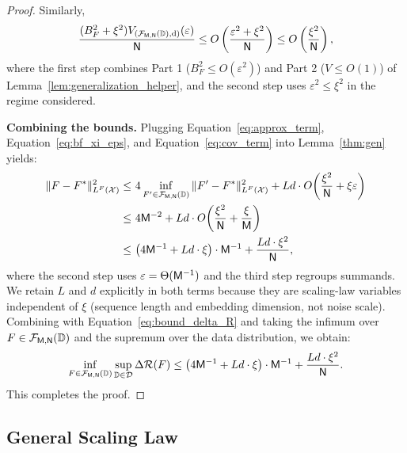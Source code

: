 \documentclass[11pt]{article}
\theoremstyle{plain}
\begin{document}
\begin{proof}
    Similarly,
    \begin{align}\label{eq:cov_term}
        \frac{(B_F^2+\xi^2)V_{({\cal F}_{\sf M, N}(\mathbb{D}), {\rm d})}(\varepsilon)}{\sf N}
        \leq O\left(\frac{\varepsilon^2+\xi^2}{\sf N}\right) \leq O\left(\frac{\xi^2}{\sf N}\right),
    \end{align}
    where the first step combines Part 1 ($B_F^2\leq O(\varepsilon^2)$) and Part 2 ($V \leq O(1)$) of Lemma~\ref{lem:generalization_helper}, and the second step uses $\varepsilon^2 \leq \xi^2$ in the regime considered.

    {\bf Combining the bounds.} Plugging Equation~\eqref{eq:approx_term}, Equation~\eqref{eq:bf_xi_eps}, and Equation~\eqref{eq:cov_term} into Lemma~\ref{thm:gen} yields:
    \begin{align*}
        \| F - F^* \|_{L^F({\cal X})}^2
        \leq & ~ 4 \inf_{F' \in {\cal F}_{\sf M, N}(\mathbb{D})} \| F' - F^* \|_{L^F({\cal X})}^2 + Ld \cdot O\!\left(\frac{\xi^2}{\sf N} + \xi\varepsilon\right) \\
        \leq & ~ 4 {\sf M}^{-2} + Ld \cdot O\!\left(\frac{\xi^2}{\sf N} + \frac{\xi}{\sf M}\right) \\
        \leq & ~ \big(4 {\sf M}^{-1} + Ld\cdot\xi\big) \cdot {\sf M}^{-1} + \frac{Ld\cdot \xi^2}{\sf N},
    \end{align*}
    where the second step uses $\varepsilon = \Theta({\sf M}^{-1})$ and the third step regroups summands. We retain $L$ and $d$ explicitly in both terms because they are scaling-law variables independent of $\xi$ (sequence length and embedding dimension, not noise scale). Combining with Equation~\eqref{eq:bound_delta_R} and taking the infimum over $F\in {\cal F}_{\sf M, N}(\mathbb{D})$ and the supremum over the data distribution, we obtain:
    \begin{align*}
        \inf_{F \in {\cal F}_{\sf M, N}(\mathbb{D})} \sup_{\mathbb{D} \in {\cal D}} \Delta{\cal R}(F) \leq \big(4{\sf M}^{-1} + Ld\cdot \xi\big) \cdot {\sf M}^{-1} + \frac{Ld \cdot\xi^2}{\sf N}.
    \end{align*}
    This completes the proof.
\end{proof}

\subsection{General Scaling Law}\label{app_sub:scaling_law}
\end{document}
